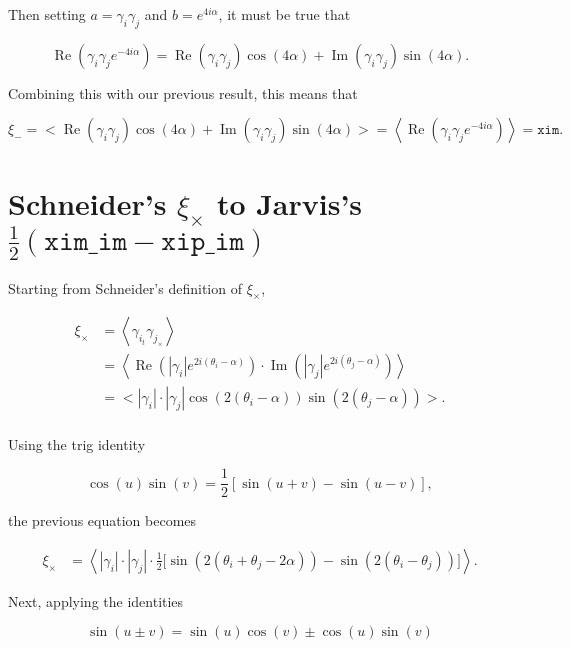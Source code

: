 \documentclass[%
 reprint,
 amsmath,amssymb,
 aps,
]{revtex4-1}
\begin{document}
Then setting $a=\gamma_i\gamma_j$ and $b=e^{4i\alpha}$, it must be true that

$$\operatorname{Re}\left(\gamma_i\gamma_je^{-4i\alpha}\right)=\operatorname{Re}(\gamma_i\gamma_j)\cos(4\alpha)+\operatorname{Im}(\gamma_i\gamma_j)\sin(4\alpha).$$

Combining this with our previous result, this means that

$$\xi_-=\big<\operatorname{Re}(\gamma_i\gamma_j)\cos(4\alpha)+\operatorname{Im}(\gamma_i\gamma_j)\sin(4\alpha)\big>=\left<\operatorname{Re}\left(\gamma_i\gamma_je^{-4i\alpha}\right)\right>=\texttt{xim}.$$

\section*{Schneider's $\xi_\times$ to Jarvis's $\frac{1}{2}\left(\texttt{xim\_im}-\texttt{xip\_im}\right)$}

Starting from Schneider's definition of $\xi_\times$,

\begin{align*}
\xi_\times&=\left<\gamma_{i_t}\gamma_{j_\times}\right>\\
&=\left<\operatorname{Re}\left(|\gamma_i|e^{2i(\theta_i-\alpha)}\right)\cdot\operatorname{Im}\left(|\gamma_j|e^{2i(\theta_j-\alpha)}\right)\right>\\
&=\big<|\gamma_i|\cdot|\gamma_j|\cos\left(2(\theta_i-\alpha)\right)\sin\left(2(\theta_j-\alpha)\right)\big>.\\
\end{align*}

Using the trig identity

\begin{equation}\label{trig3}
\cos(u)\sin(v)=\frac{1}{2}\left[\sin(u+v)-\sin(u-v)\right],
\end{equation}

the previous equation becomes

\begin{align*}
\xi_\times&=\left<|\gamma_i|\cdot|\gamma_j|\cdot\frac{1}{2}\big[\sin\left(2(\theta_i+\theta_j-2\alpha)\right)-\sin\left(2(\theta_i-\theta_j)\right)\big]\right>.
\end{align*}

Next, applying the identities

\begin{equation}\label{trig4}
\sin(u\pm v)=\sin(u)\cos(v)\pm\cos(u)\sin(v)
\end{equation}
\end{document}
